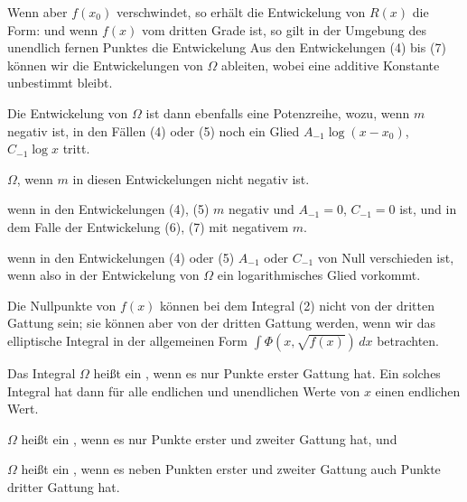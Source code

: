Wenn aber $f(x_0)$ verschwindet, so erhält die Entwickelung von $R(x)$ die Form:
und wenn $f(x)$ vom dritten Grade ist, so gilt in der Umgebung des unendlich fernen Punktes die Entwickelung
Aus den Entwickelungen (4) bis (7) können wir die Entwickelungen von $\Omega$ ableiten, wobei eine additive Konstante unbestimmt bleibt.

Die Entwickelung von $\Omega$ ist dann ebenfalls eine Potenzreihe, wozu, wenn $m$ negativ ist, in den Fällen (4) oder (5) noch ein Glied $A_{-1}\log(x-x_0)$, $C_{-1}\log x$ tritt.

 $\Omega$, wenn $m$ in diesen Entwickelungen nicht negativ ist.


 wenn in den Entwickelungen (4), (5) $m$ negativ und $A_{-1} = 0$, $C_{-1} = 0$ ist, und in dem Falle der Entwickelung (6), (7) mit negativem $m$.

 wenn in den Entwickelungen (4) oder (5) $A_{-1}$ oder $C_{-1}$ von Null verschieden ist, wenn also in der Entwickelung von $\Omega$ ein logarithmisches Glied vorkommt.

Die Nullpunkte von $f(x)$ können bei dem Integral (2) nicht von der dritten Gattung sein; sie können aber von der dritten Gattung werden, wenn wir das elliptische Integral in der allgemeinen Form $\int \Phi(x, \sqrt{f(x)})\,dx$ betrachten.

Das Integral $\Omega$ heißt ein , wenn es nur Punkte erster Gattung hat. Ein solches Integral hat dann für alle endlichen und unendlichen Werte von $x$ einen endlichen Wert.

$\Omega$ heißt ein , wenn es nur Punkte erster und zweiter Gattung hat, und

$\Omega$ heißt ein , wenn es neben Punkten erster und zweiter Gattung auch Punkte dritter Gattung hat.
